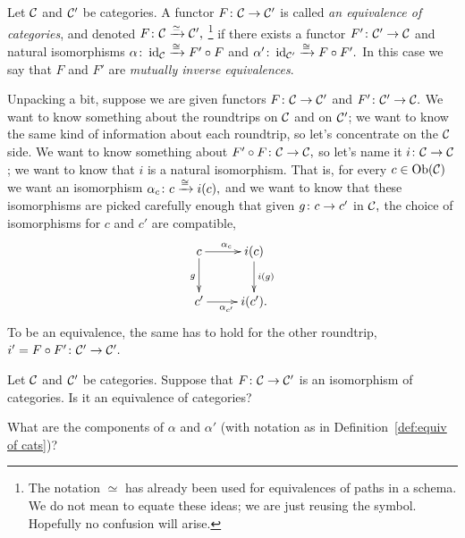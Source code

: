 \documentclass[../main/CT4S-EN-RU]{subfiles}
\begin{document}
\begin{blockRUS}
\end{blockRUS}

\begin{definitionENG}\label{def:equiv of cats}
Let $\mathcal{C}$ and $\mathcal{C}'$ be categories. A functor $F\colon\mathcal{C}\rightarrow\mathcal{C}'$ is called {\em an equivalence of categories}, and denoted $F\colon\mathcal{C}\xrightarrow{\simeq}\mathcal{C}',$
\footnote{The notation $\simeq$ has already been used for equivalences of paths in a schema. We do not mean to equate these ideas; we are just reusing the symbol. Hopefully no confusion will arise.}
 if there exists a functor $F'\colon\mathcal{C}'\rightarrow\mathcal{C}$ and natural isomorphisms $\alpha\colon \operatorname{id}_\mathcal{C}\xrightarrow{\cong}F'\circ F$ and $\alpha'\colon\operatorname{id}_{\mathcal{C}'}\xrightarrow{\cong}F\circ F'.$ In this case we say that $F$ and $F'$ are {\em mutually inverse equivalences}.
\end{definitionENG}

\begin{definitionRUS}\label{def:equiv of cats}
\end{definitionRUS}

\begin{blockENG}
Unpacking a bit, suppose we are given functors $F\colon\mathcal{C}\rightarrow\mathcal{C}'$ and $F'\colon\mathcal{C}'\rightarrow\mathcal{C}.$ We want to know something about the roundtrips on $\mathcal{C}$ and on $\mathcal{C}'$; we want to know the same kind of information about each roundtrip, so let's concentrate on the $\mathcal{C}$ side. We want to know something about $F'\circ F\colon\mathcal{C}\rightarrow\mathcal{C},$ so let's name it $i\colon\mathcal{C}\rightarrow\mathcal{C}$; we want to know that $i$ is a natural isomorphism. That is, for every $c\in\operatorname{Ob}(\mathcal{C})$ we want an isomorphism $\alpha_c\colon c\xrightarrow{\cong} i(c),$ and we want to know that these isomorphisms are picked carefully enough that given $g\colon c\rightarrow c'$ in $\mathcal{C},$ the choice of isomorphisms for $c$ and $c'$ are compatible,
$$\xymatrix{c\ar[r]^{\alpha_c}\ar[d]_g&i(c)\ar[d]^{i(g)}\\c'\ar[r]_{\alpha_{c'}}&i(c').}$$
To be an equivalence, the same has to hold for the other roundtrip, $i'=F\circ F'\colon\mathcal{C}'\rightarrow\mathcal{C}'.$
\end{blockENG}

\begin{blockRUS}
\end{blockRUS}

\begin{exerciseENG}
Let $\mathcal{C}$ and $\mathcal{C}'$ be categories. Suppose that $F\colon\mathcal{C}\rightarrow\mathcal{C}'$ is an isomorphism of categories.
\sexc Is it an equivalence of categories?
\item What are the components of $\alpha$ and $\alpha'$ (with notation as in Definition~\ref{def:equiv of cats})?
\endsexc
\end{exerciseENG}
\end{document}
